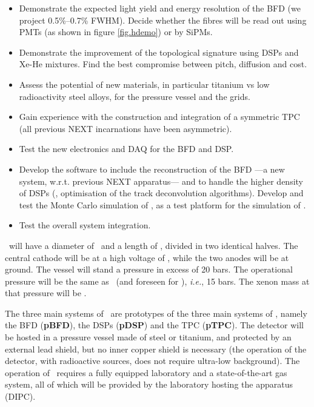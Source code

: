 \begin{itemize}[noitemsep,topsep=0pt,parsep=0pt,partopsep=0pt]
\item Demonstrate the expected light yield and energy resolution of the BFD (we project 0.5\%--0.7\% FWHM). Decide whether the fibres will be read out using PMTs (as shown in figure \ref{fig.hdemo}) or by SiPMs. 
\item Demonstrate the improvement of the topological signature using DSPs and Xe-He mixtures. Find the best compromise between pitch, diffusion and cost. 
\item Assess the potential of new materials, in particular titanium vs low radioactivity steel alloys, for the pressure vessel and the grids. 
\item Gain experience with the construction and integration of a symmetric TPC (all previous NEXT incarnations have been asymmetric). 
\item Test the new electronics and DAQ for the BFD and DSP.
\item Develop the software to include the reconstruction of the BFD ---a new system, w.r.t. previous NEXT apparatus--- and to handle the higher density of DSPs (\eg, optimisation of the track deconvolution algorithms). Develop and test the Monte Carlo simulation of \HDEMO, as a test platform for the simulation of \NHD. 
\item Test the overall system integration. 
\end{itemize}



\HDEMO\ will have a diameter of \HDD\ and a length of \HDL, divided in two identical halves. The central cathode will be at a high voltage of \HDHV, while the two anodes will be at ground. The vessel will stand a pressure in excess of 20 bars. The operational pressure will be the same as \Next\ (and foreseen for \NHD), \emph{i.e.}, 15 bars. The xenon mass at that pressure will be \HDM. 



The three main systems of \HDEMO\ are  prototypes of the three main systems of \NHD, namely the BFD ({\bf pBFD}), the DSPs ({\bf pDSP}) and  the TPC ({\bf pTPC}). The detector will be hosted in a pressure vessel made of steel or titanium, and protected by an external lead shield, but no inner copper shield is necessary (the operation of the detector, with radioactive sources, does not require ultra-low background). The operation of \HDEMO\ requires a fully equipped laboratory and a state-of-the-art gas system, all of which will be provided by the laboratory hosting the apparatus (DIPC). 


